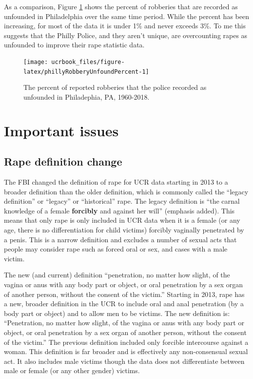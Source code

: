 \documentclass[
  12pt,
  openany]{book}
\begin{document}
As a comparison, Figure \ref{fig:phillyRobberyUnfoundPercent} shows the percent of robberies that are recorded as unfounded in Philadelphia over the same time period. While the percent has been increasing, for most of the data it is under 1\% and never exceeds 3\%. To me this suggests that the Philly Police, and they aren't unique, are overcounting rapes as unfounded to improve their rape statistic data.

\begin{figure}

{\centering \texttt{[image: ucrbook\_files/figure-latex/phillyRobberyUnfoundPercent-1]} 

}

\caption{The percent of reported robberies that the police recorded as unfounded in Philadephia, PA, 1960-2018.}\label{fig:phillyRobberyUnfoundPercent}
\end{figure}

\hypertarget{important-issues}{%
\section{Important issues}\label{important-issues}}

\hypertarget{rape-definition-change}{%
\subsection{Rape definition change}\label{rape-definition-change}}

The FBI changed the definition of rape for UCR data starting in 2013 to a broader definition than the older definition, which is commonly called the ``legacy definition'' or ``legacy'' or ``historical'' rape. The legacy definition is ``the carnal knowledge of a female \textbf{forcibly} and against her will'' (emphasis added). This means that only rape is only included in UCR data when it is a female (or any age, there is no differentiation for child victims) forcibly vaginally penetrated by a penis. This is a narrow definition and excludes a number of sexual acts that people may consider rape such as forced oral or sex, and cases with a male victim.

The new (and current) definition ``penetration, no matter how slight, of the vagina or anus with any body part or object, or oral penetration by a sex organ of another person, without the consent of the victim.'' Starting in 2013, rape has a new, broader definition in the UCR to include oral and anal penetration (by a body part or object) and to allow men to be victims. The new definition is: ``Penetration, no matter how slight, of the vagina or anus with any body part or object, or oral penetration by a sex organ of another person, without the consent of the victim.'' The previous definition included only forcible intercourse against a woman. This definition is far broader and is effectively any non-consensual sexual act. It also includes male victims though the data does not differentiate between male or female (or any other gender) victims.
\end{document}
